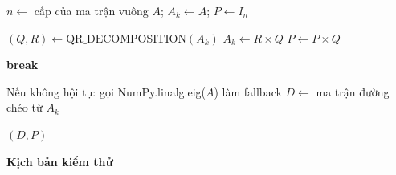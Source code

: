 





\begin{algorithm}
\caption{Chéo Hóa Ma Trận - QR Iteration}
\label{alg:diagonalize}
\begin{algorithmic}[1]
    \State $n \gets$ cấp của ma trận vuông $A$; $A_k \gets A$; $P \gets I_n$
    
        \State $(Q, R) \gets \text{QR\_DECOMPOSITION}(A_k)$ 
        \State $A_k \gets R \times Q$ 
        \State $P \gets P \times Q$ 
        
        \State {}
            \State \textbf{break}
        \EndIf
    \EndFor
    
    \State Nếu không hội tụ: gọi NumPy.linalg.eig($A$) làm fallback
    \State $D \gets$ ma trận đường chéo từ $A_k$

    \State \Return $(D, P)$
\EndProcedure
\end{algorithmic}
\end{algorithm}
\textbf{Kịch bản kiểm thử}

